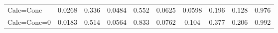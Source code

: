 \begin{tabular}{rrrrrrrrrr}
\multicolumn{1}{l}{Calc=Conc} & \multicolumn{1}{c}{0.0268} & \multicolumn{1}{c}{0.336} & \multicolumn{1}{c}{0.0484} & \multicolumn{1}{c}{0.552} & \multicolumn{1}{c}{0.0625} & \multicolumn{1}{c}{0.0598} & \multicolumn{1}{c}{0.196} & \multicolumn{1}{c}{0.128} & \multicolumn{1}{c}{0.976} \\
\multicolumn{1}{l}{Calc=Conc=0} & \multicolumn{1}{c}{0.0183} & \multicolumn{1}{c}{0.514} & \multicolumn{1}{c}{0.0564} & \multicolumn{1}{c}{0.833} & \multicolumn{1}{c}{0.0762} & \multicolumn{1}{c}{0.104} & \multicolumn{1}{c}{0.377} & \multicolumn{1}{c}{0.206} & \multicolumn{1}{c}{0.992} \\
\bottomrule
\bottomrule
\end{tabular}%
